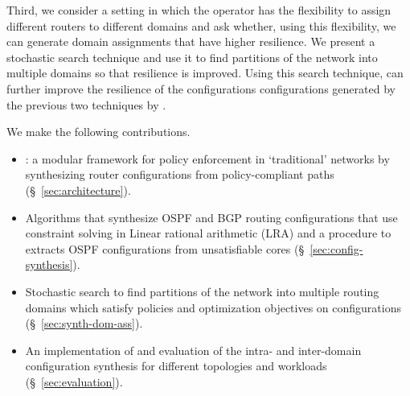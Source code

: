 Third,  we consider a setting in which the operator has the flexibility to
assign different routers to different domains and ask whether, using this flexibility, we can 
generate domain assignments that have higher resilience.
We present a stochastic search technique and use it to find
partitions of the network into multiple domains so that resilience is improved.
Using this search technique, \name can further improve the resilience of the configurations 
configurations generated by the previous two techniques by
.




 We make the following contributions. 
\begin{itemize}
	\item \name: a modular framework 
	for policy enforcement in `traditional' networks
	by synthesizing router configurations from policy-compliant paths (\S~\ref{sec:architecture}). 
	\item Algorithms that synthesize OSPF and BGP routing configurations that use
	constraint solving in Linear rational arithmetic (LRA) and 
	a procedure to extracts OSPF configurations from 
	unsatisfiable cores (\S~\ref{sec:config-synthesis}). 
	\item Stochastic search to find 
	partitions of the network into multiple routing domains which
	satisfy policies and optimization objectives on configurations (\S~\ref{sec:synth-dom-ass}).
	\item An implementation of \name and evaluation of the 
	intra- and inter-domain configuration synthesis for different
	topologies and workloads (\S~\ref{sec:evaluation}). 
\end{itemize}

